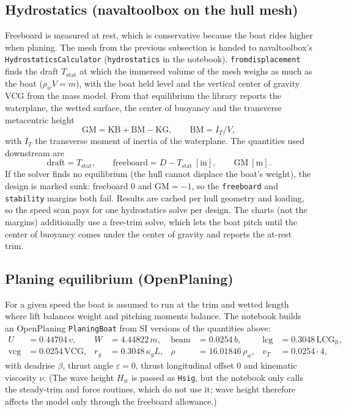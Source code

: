 \documentclass[11pt,a4paper]{article}
\renewcommand{\_}{\textunderscore\allowbreak}
\newcommand{\code}[1]{\texttt{#1}}
\newcommand{\lcg}{\mathrm{LCG}}
\newcommand{\vcg}{\mathrm{VCG}}
\begin{document}
\subsection{Hydrostatics (navaltoolbox on the hull mesh)}
\label{eq:draft}
Freeboard is measured at rest, which is conservative because the boat rides higher when planing.
The mesh from the previous subsection is handed to navaltoolbox's \code{HydrostaticsCalculator}
(\code{hydrostatics} in the notebook). \code{from\_displacement} finds the draft $T_{\mathrm{stat}}$ at which
the immersed volume of the mesh weighs as much as the boat ($\rho_w V = m$), with the boat held level and the
vertical center of gravity $\vcg$ from the mass model. From that equilibrium the library reports the
waterplane, the wetted surface, the center of buoyancy and the transverse metacentric height
\begin{equation}
  \mathrm{GM} = \mathrm{KB} + \mathrm{BM} - \mathrm{KG}, \qquad \mathrm{BM} = I_T/V,
\end{equation}
with $I_T$ the transverse moment of inertia of the waterplane. The quantities used downstream are
\begin{equation*}
  \text{draft} = T_{\mathrm{stat}}, \qquad \text{freeboard} = D - T_{\mathrm{stat}}\ [\mathrm{in}], \qquad \mathrm{GM}\ [\mathrm m].
\end{equation*}
If the solver finds no equilibrium (the hull cannot displace the boat's weight), the design is marked sunk:
freeboard $0$ and $\mathrm{GM}=-1$, so the \code{freeboard} and \code{stability} margins both fail.
Results are cached per hull geometry and loading, so the speed scan pays for one hydrostatics solve per design.
The charts (not the margins) additionally use a free-trim solve, which lets the boat pitch until the center of
buoyancy comes under the center of gravity and reports the at-rest trim.

\subsection{Planing equilibrium (OpenPlaning)}
\label{sec:planing}
For a given speed the boat is assumed to run at the trim and wetted length where lift balances weight and pitching
moments balance. The notebook builds an OpenPlaning \code{PlaningBoat} from SI versions of the quantities above:
\begin{align*}
  U &= 0.44704\,v, &
  W &= 4.44822\,m, &
  \text{beam} &= 0.0254\,b, &
  \text{lcg} &= 0.3048\,\lcg_{\mathrm{ft}},\\
  \text{vcg} &= 0.0254\,\vcg, &
  r_g &= 0.3048\,\kappa_g L, &
  \rho &= 16.01846\,\rho_w, &
  v_T &= 0.0254\cdot 4,
\end{align*}
with deadrise $\beta$, thrust angle $\varepsilon=0$, thrust longitudinal offset $0$ and kinematic viscosity $\nu$.
(The wave height $H_w$ is passed as \code{H\_sig}, but the notebook only calls the steady-trim and force routines, which do
not use it; wave height therefore affects the model only through the freeboard allowance.)
\end{document}
